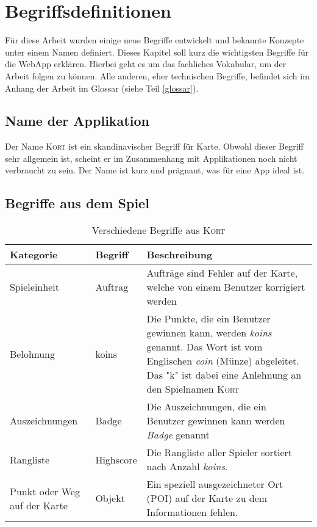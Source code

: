 \chapter{Begriffsdefinitionen}
\label{kort-definitionen}

Für diese Arbeit wurden einige neue Begriffe entwickelt und bekannte Konzepte unter einem Namen definiert.
Dieses Kapitel soll kurz die wichtigsten Begriffe für die \gls{WebApp} erklären.
Hierbei geht es um das fachliches Vokabular, um der Arbeit folgen zu können.
Alle anderen, eher technischen Begriffe, befindet sich im Anhang der Arbeit im Glossar (siehe Teil \ref{glossar}).

\section{Name der Applikation}
Der Name \textsc{Kort} ist ein skandinavischer Begriff für Karte.
Obwohl dieser Begriff sehr allgemein ist, scheint er im Zusammenhang mit Applikationen noch nicht verbraucht zu sein.
Der Name ist kurz und prägnant, was für eine App ideal ist.

\section{Begriffe aus dem Spiel}

\begin{table}[H]
\centering
\begin{tabular}{|p{0.2\threecelltabwidth}|p{0.2\threecelltabwidth}|p{0.6\threecelltabwidth}|}
\hline 
\small{\textbf{Kategorie}} & \small{\textbf{Begriff}} & \small{\textbf{Beschreibung}} \\
\hline 
Spieleinheit & Auftrag & Aufträge sind Fehler auf der Karte, welche von einem Benutzer korrigiert werden \\
\hline 
Belohnung & koins & Die Punkte, die ein Benutzer gewinnen kann, werden \emph{koins} genannt.
Das Wort ist vom Englischen \emph{coin} (Münze) abgeleitet. 
Das "k" ist dabei eine Anlehnung an den Spielnamen \textsc{Kort} \\
\hline 
Auszeichnungen & Badge & Die Auszeichnungen, die ein Benutzer gewinnen kann werden \emph{Badge} genannt \\
\hline 
Rangliste & Highscore & Die Rangliste aller Spieler sortiert nach Anzahl \emph{koins}. \\
\hline 
Punkt oder Weg auf der Karte & Objekt & Ein speziell ausgezeichneter Ort (\gls{POI}) auf der Karte zu dem Informationen fehlen. \\
\hline 
\end{tabular}
\caption{Verschiedene Begriffe aus \textsc{Kort}}
\label{table-definitionen}
\end{table}

